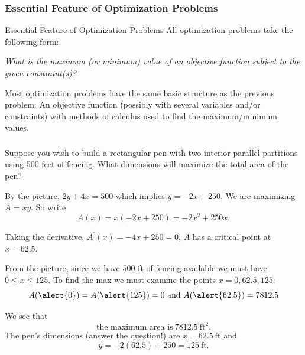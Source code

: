 \documentclass[cal1spr16Lectures.tex]{subfiles}
\begin{document}
\subsubsection{Essential Feature of Optimization Problems}

\begin{frame}{\small Essential Feature of Optimization Problems}
\small
All optimization problems take the following form:
\begin{center}
\alert{\it What is the maximum (or minimum) value of an objective function subject to the given constraint(s)?}
\end{center}

\vspace{2pc}
Most optimization problems have the same basic structure as the previous problem:  An objective function (possibly with several variables and/or constraints) with methods of calculus used to find the maximum/minimum values.
\end{frame}

\begin{frame}
\frametitle{}
\small
\begin{exe} Suppose you wish to build a rectangular pen with two interior parallel partitions using 500 feet of fencing.  What dimensions will maximize the total area of the pen?
\begin{center}
\end{center}
\end{exe}
\end{frame}

\begin{frame}
\small
By the picture, $2y+4x=500$ which implies $y=-2x+250$.  We are maximizing $A=xy$.  So write
\[A(x)=x(-2x+250)=-2x^2+250x.\]

Taking the derivative, $A^{\prime}(x)=-4x+250=0$, $A$ has a critical point at $x=62.5.$
\end{frame}

\begin{frame}
\footnotesize
From the picture, since we have $500$ ft of fencing available we must have $0 \le x \le 125$.  To find the max we must examine the points $x=0,62.5,125$:
\[A(\alert{0})=A(\alert{125})=0\text{ and }A(\alert{62.5})=7812.5\]

\vspace{1pc}
We see that 
\[\boxed{\text{the maximum area is}\ 7812.5\ \text{ft}^2.}\]
The pen's dimensions (answer the question!) are $\boxed{x=62.5\ \text{ft}}$ and 
\[\boxed{y=-2(62.5)+250=125\ \text{ft}.}\]
\end{frame}
\end{document}
